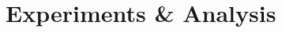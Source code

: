 \documentclass[10pt,twocolumn,letterpaper]{article}
\begin{document}





    



\section{Experiments \& Analysis}
\end{document}
